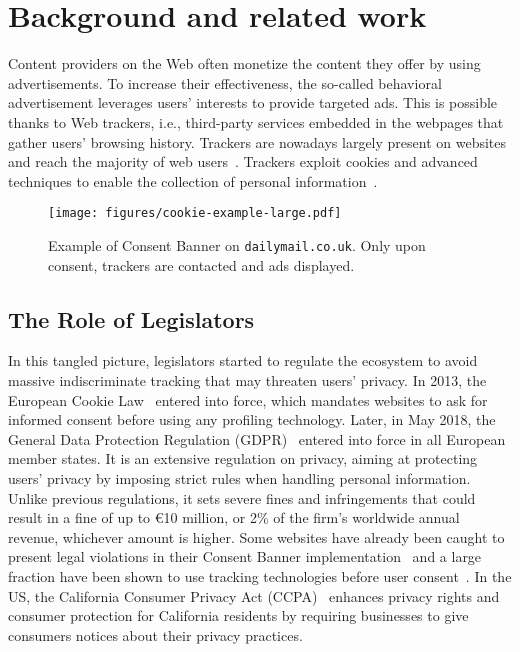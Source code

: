 \section{Background and related work}
\label{sec:history}

Content providers on the Web often monetize the content they offer by using advertisements. To increase their effectiveness, the so-called behavioral advertisement leverages users' interests to provide targeted ads. This is possible thanks to Web trackers, i.e., third-party services embedded in the webpages that gather users' browsing history. Trackers are nowadays largely present on websites and reach the majority of web users~\cite{metwalley2015online,pujol2015annoyed}. Trackers exploit cookies and advanced techniques to enable the collection of personal information~\cite{acar2014web,rizzo2021unveiling,papadogiannakis2021}.


\begin{figure}[t]
    \centering
    \texttt{[image: figures/cookie-example-large.pdf]}
    \caption{Example of Consent Banner on \texttt{dailymail.co.uk}. Only upon consent, trackers are contacted and ads displayed.}
    \label{fig:cookie_accept_example}
\end{figure}

\subsection{The Role of Legislators}

In this tangled picture, legislators started to regulate the ecosystem to avoid massive indiscriminate tracking that may threaten users' privacy. In 2013, the European Cookie Law~\cite{directive2009} entered into force, which mandates websites to ask for informed consent before using any profiling technology. Later, in May 2018, the General Data Protection Regulation (GDPR)~\cite{gpdr} entered into force in all European member states. It is an extensive regulation on privacy, aiming at protecting users' privacy by imposing strict rules when handling personal information. Unlike previous regulations, it sets severe fines and infringements that could result in a fine of up to €10 million, or 2\% of the firm's worldwide annual revenue, whichever amount is higher. Some websites have already been caught to present legal violations in their Consent Banner implementation~\cite{matte2020cookie} and a large fraction have been shown to use tracking technologies before user consent~\cite{trevisan20194, sanchez2019can}. In the US, the California Consumer Privacy Act (CCPA)~\cite{ccpa} enhances privacy rights and consumer protection for California residents by requiring businesses to give consumers notices about their privacy practices.

